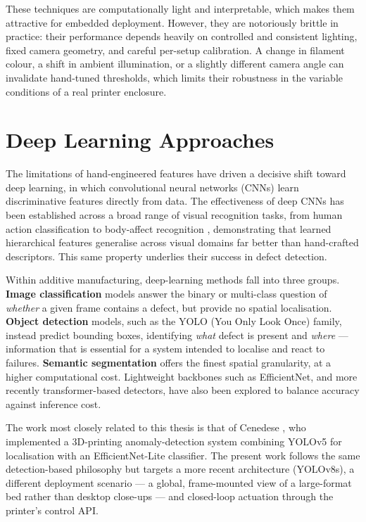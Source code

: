 \documentclass[english, Lau, oneside]{sapthesis}
\begin{document}
These techniques are computationally light and interpretable, which makes them attractive for embedded deployment. However, they are notoriously brittle in practice: their performance depends heavily on controlled and consistent lighting, fixed camera geometry, and careful per-setup calibration. A change in filament colour, a shift in ambient illumination, or a slightly different camera angle can invalidate hand-tuned thresholds, which limits their robustness in the variable conditions of a real printer enclosure.

\section{Deep Learning Approaches}
The limitations of hand-engineered features have driven a decisive shift toward deep learning, in which convolutional neural networks (CNNs) learn discriminative features directly from data. The effectiveness of deep CNNs has been established across a broad range of visual recognition tasks, from human action classification \cite{cascio2017} to body-affect recognition \cite{fagioli2019}, demonstrating that learned hierarchical features generalise across visual domains far better than hand-crafted descriptors. This same property underlies their success in defect detection.

Within additive manufacturing, deep-learning methods fall into three groups. \textbf{Image classification} models answer the binary or multi-class question of \textit{whether} a given frame contains a defect, but provide no spatial localisation. \textbf{Object detection} models, such as the YOLO (You Only Look Once) family, instead predict bounding boxes, identifying \textit{what} defect is present and \textit{where} --- information that is essential for a system intended to localise and react to failures. \textbf{Semantic segmentation} offers the finest spatial granularity, at a higher computational cost. Lightweight backbones such as EfficientNet, and more recently transformer-based detectors, have also been explored to balance accuracy against inference cost.

The work most closely related to this thesis is that of Cenedese \cite{cenedese2022}, who implemented a 3D-printing anomaly-detection system combining YOLOv5 for localisation with an EfficientNet-Lite classifier. The present work follows the same detection-based philosophy but targets a more recent architecture (YOLOv8s), a different deployment scenario --- a global, frame-mounted view of a large-format bed rather than desktop close-ups --- and closed-loop actuation through the printer's control API.
\end{document}
